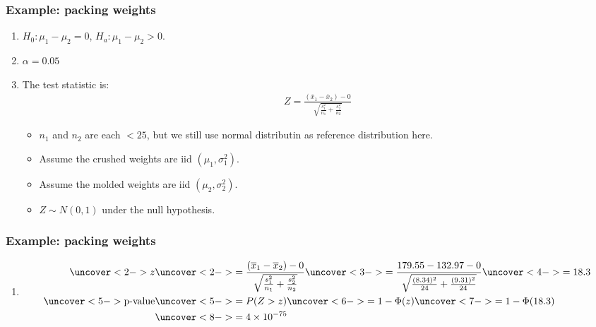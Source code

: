\documentclass[handout]{beamer}\usepackage[]{graphicx}\usepackage[]{color}
\providecommand{\ov}[1]{\overline{#1}}
\numberwithin{equation}{section}
\begin{document}
\begin{frame}
\frametitle{Example: packing weights}
\begin{enumerate}[1. ]
\item $H_0:  \mu_1 - \mu_2 = 0$, $H_a: \mu_1 - \mu_2 > 0$.
\pause \item $\alpha = 0.05$
\pause \item The test statistic is:
\pause \begin{align*}
Z = \frac{(\ov{x}_1 - \ov{x}_2) - 0}{\sqrt{\frac{s^2_1}{n_1} + \frac{s^2_2}{n_2}}}
\end{align*}
\begin{itemize}
\pause \item $n_1$ and $n_2$ are each $< 25$, but we still use normal distributin as reference distribution here.
\pause \item Assume the crushed weights are iid $(\mu_1, \sigma^2_1)$.
\pause \item Assume the molded weights are iid  $(\mu_2, \sigma^2_2)$.
\pause \item $Z \sim N(0,1)$ under the null hypothesis.
\end{itemize}
\setcounter{saveenum}{\value{enumi}}

\end{enumerate}
\end{frame}

\begin{frame}
\frametitle{Example: packing weights}
\begin{enumerate}[1. ]
 \setcounter{enumi}{\value{saveenum}}
\item 
\begin{align*}
\uncover<2->{z} &\uncover<2->{=  \frac{(\ov{x}_1 - \ov{x}_2) - 0}{\sqrt{\frac{s^2_1}{n_1} + \frac{s^2_2}{n_2}}}} \uncover<3->{= \frac{179.55 - 132.97 - 0}{\sqrt{\frac{(8.34)^2}{24} + \frac{(9.31)^2}{24}}}} \uncover<4->{= 18.3} \\
\uncover<5->{\text{p-value}} &\uncover<5->{= P(Z > z)} \uncover<6->{ = 1 - \Phi(z)} \uncover<7->{= 1 - \Phi(18.3)} \\
&\uncover<8->{= 4 \times 10^{-75}}
\end{align*}
\end{enumerate}
\end{frame}
\end{document}
